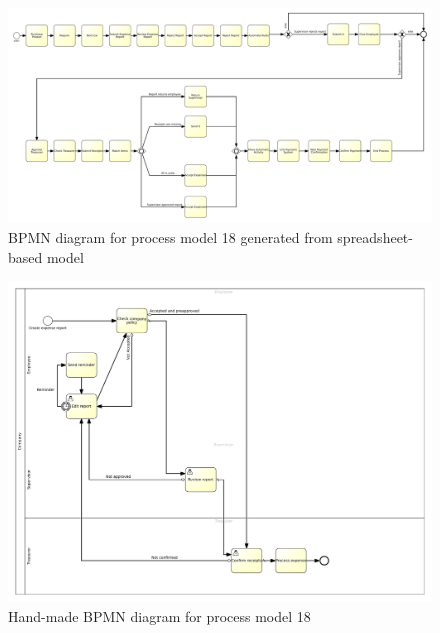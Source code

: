 \begin{figure}[H]
	\centering
	\includegraphics[width=\hsize]{./generated_bpmn/model18.pdf}
	\caption{BPMN diagram for process model 18 generated from spreadsheet-based model}
	\label{bpmn:generated_model18}
\end{figure}

\begin{figure}[H]
	\centering
	\includegraphics[width=\hsize]{./bpmn/model18.pdf}
	\caption{Hand-made BPMN diagram for process model 18}
	\label{bpmn:model18}
\end{figure}

